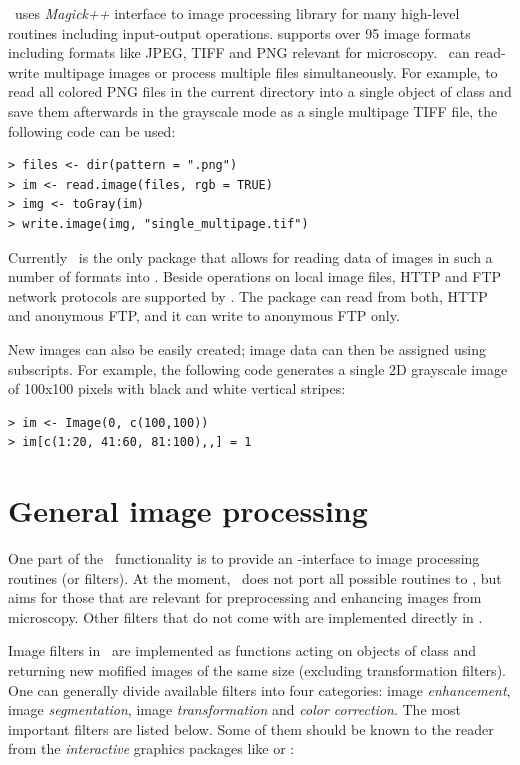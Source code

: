 \EBImage\ uses {\em Magick++} interface to  image processing library \citep{R:ImageMagick:1999} for many high-level routines including input-output operations.  supports over 95 image formats including formats like JPEG, TIFF and PNG relevant for microscopy. \EBImage\ can read-write multipage images or process multiple files simultaneously. For example, to read all colored PNG files in the current directory into a single object of class  and save them afterwards in the grayscale mode as a single multipage TIFF file, the following code can be used:

\begin{verbatim}
> files <- dir(pattern = ".png")
> im <- read.image(files, rgb = TRUE)
> img <- toGray(im)
> write.image(img, "single_multipage.tif")
\end{verbatim}

Currently \EBImage\ is the only \R{} package that allows for reading data of images in such a number of formats into \R{}. Beside operations on local image files, HTTP and FTP network protocols are supported by \EBImage. The package can read from both, HTTP and anonymous FTP, and it can write to anonymous FTP only.

New images can also be easily created; image data can then be assigned using subscripts. For example, the following code generates a single 2D grayscale image of 100x100 pixels with black and white vertical stripes:

\begin{verbatim}
> im <- Image(0, c(100,100))
> im[c(1:20, 41:60, 81:100),,] = 1
\end{verbatim}

\section*{General image processing}

One part of the \EBImage\ functionality is to provide an \R{}-interface to  image processing routines (or filters). At the moment, \EBImage\ does not port all possible  routines to \R{}, but aims for those that are relevant for preprocessing and enhancing images from microscopy. Other filters that do not come with  are implemented directly in \EBImage.

Image filters in \EBImage\ are implemented as functions acting on objects of class  and returning new mofified images of the same size (excluding transformation filters). One can generally divide available filters into four categories: image {\em enhancement}, image {\em segmentation}, image {\em transformation} and {\em color correction}. The most important filters are listed below. Some of them should be known to the reader from the {\em interactive} graphics packages like  or :

